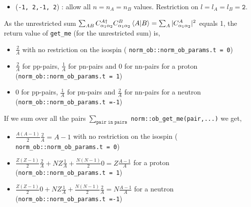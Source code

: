 \documentclass[10pt]{article}
\begin{document}
\begin{itemize}
\begin{itemize}
			\item (\texttt{-1, 2,-1, 2}) : allow all $n = n_A = n_B$ values. Restriction on $l = l_A = l_B = \texttt{2}$.
		\end{itemize}
	As the unrestricted sum $\sum_{ A B } C_{\alpha_1 \alpha_2}^{A \dagger} C_{\alpha_1 \alpha_2}^{B} \braket {A | B } = \sum_{A} | C^{A}_{\alpha_1 \alpha_2}|^{2} $ equals 1, the return value of \texttt{get\_me} (for the unrestricted sum) is,
	\begin{itemize}
		\item $\frac{2}{A}$ with no restriction on the isospin ( \texttt{norm\_ob::norm\_ob\_params.t = 0})
		\item $\frac{2}{A}$ for pp-pairs, $\frac{1}{A}$ for pn-pairs and $0$ for nn-pairs for a proton (\texttt{norm\_ob::norm\_ob\_params.t~=~1})
		\item $0$ for pp-pairs, $\frac{1}{A}$ for pn-pairs and $\frac{2}{A}$ for nn-pairs for a neutron (\texttt{norm\_ob::norm\_ob\_params.t~=-1})
	\end{itemize}
	If we sum over all the pairs $ \sum_{\texttt{pair in pairs}} $ \texttt{norm::ob\_get\_me(pair,...)} we get,
	\begin{itemize}
		\item $\frac{A(A-1)}{2} \frac{2}{A} = A-1$ with no restriction on the isospin ( \texttt{norm\_ob::norm\_ob\_params.t~=~0})
		\item $\frac{Z(Z-1)}{2}\frac{2}{A} + NZ \frac{1}{A} + \frac{N(N-1)}{2} 0 = Z \frac{A-1}{A}$ for a proton (\texttt{norm\_ob::norm\_ob\_params.t~=~1})
		\item $\frac{Z(Z-1)}{2}0 + NZ \frac{1}{A} + \frac{N(N-1)}{2} \frac{2}{A} = N \frac{A-1}{A}$ for a neutron (\texttt{norm\_ob::norm\_ob\_params.t~=-1})
	\end{itemize}
\end{itemize}
\end{document}
